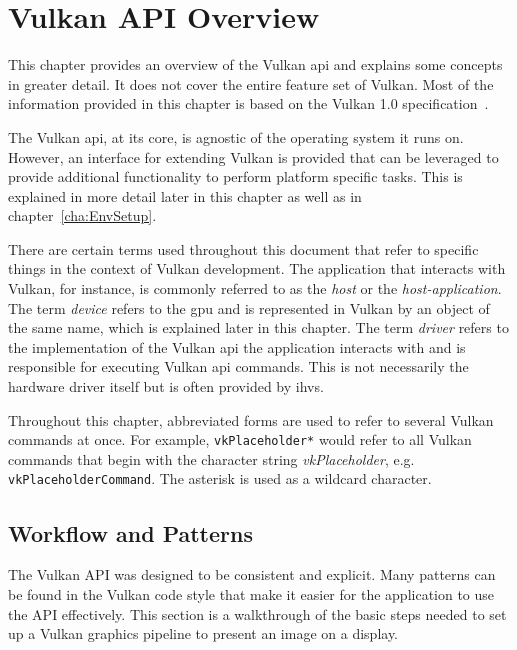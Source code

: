 
\chapter{Vulkan API Overview}
\label{cha:VulkanOverview}
  This chapter provides an overview of the Vulkan \gls{api} and explains some concepts in greater detail.
  It does not cover the entire feature set of Vulkan.
  Most of the information provided in this chapter is based on the Vulkan 1.0 specification~\cite{vkspec}.

  The Vulkan \gls{api}, at its core, is agnostic of the operating system it runs on.
  However, an interface for extending Vulkan is provided that can be leveraged to provide additional functionality to perform platform specific tasks. This is explained in more detail later in this chapter as well as in chapter~\ref{cha:EnvSetup}.

  There are certain terms used throughout this document that refer to specific things in the context of Vulkan development.
  The application that interacts with Vulkan, for instance, is commonly referred to as the \textit{host} or the \textit{host-application}.
  The term \textit{device} refers to the \gls{gpu} and is represented in Vulkan by an object of the same name, which is explained later in this chapter.
  The term \textit{\gls{driver}} refers to the implementation of the Vulkan \gls{api} the application interacts with and is responsible for executing Vulkan \gls{api} commands.
  This is not necessarily the hardware driver itself but is often provided by \glspl{ihv}.

  Throughout this chapter, abbreviated forms are used to refer to several Vulkan commands at once.
  For example, \lstinline{vkPlaceholder*} would refer to all Vulkan commands that begin with the character string \textit{vkPlaceholder}, e.g. \lstinline{vkPlaceholderCommand}. The asterisk is used as a wildcard character.

  \section{Workflow and Patterns}
  \label{sec:WorkflowAndPatterns}
    The Vulkan API was designed to be consistent and explicit.
    Many patterns can be found in the Vulkan code style that make it easier for the \gls{application} to use the API effectively.
    This section is a walkthrough of the basic steps needed to set up a Vulkan graphics pipeline to present an image on a display.

